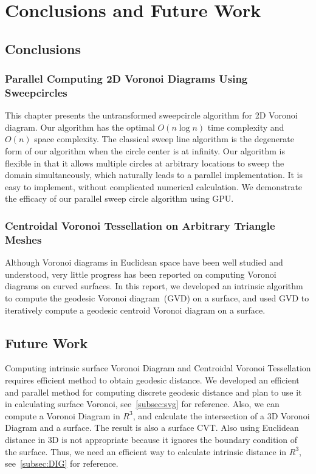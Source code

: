 \chapter{Conclusions and Future Work}
\label{conclusion}

\section{Conclusions}
\subsection{Parallel Computing 2D Voronoi Diagrams Using Sweepcircles}

This chapter presents the untransformed sweepcircle
algorithm for 2D Voronoi diagram. Our algorithm has the optimal
$O(n\log n)$ time complexity and $O(n)$ space complexity. The
classical sweep line algorithm is the degenerate form of our algorithm when the circle center is at infinity. Our
algorithm is flexible in that it allows multiple circles at
arbitrary locations to sweep the domain simultaneously, which
naturally leads to a parallel implementation. It is easy to
implement, without complicated numerical calculation. We demonstrate
the efficacy of our parallel sweep circle algorithm using GPU.

\subsection{Centroidal Voronoi Tessellation on Arbitrary Triangle Meshes}

Although Voronoi diagrams in Euclidean space have been well studied
 and understood, very little progress has been reported on computing
 Voronoi diagrams on curved surfaces. In this report, we developed
 an intrinsic algorithm to compute the geodesic Voronoi diagram~(GVD)
 on a surface, and used GVD  to iteratively
 compute a geodesic centroid Voronoi diagram on a surface.

\section{Future Work}

Computing intrinsic surface Voronoi Diagram
and Centroidal Voronoi Tessellation requires efficient
method to obtain geodesic distance. We developed an efficient
and parallel method for computing
discrete geodesic distance and plan to use it in calculating surface
Voronoi, see~\ref{subsec:svg} for reference.
Also, we can compute a Voronoi Diagram in $R^3$, and calculate
the intersection of a 3D Voronoi Diagram and a surface. The result
 is also a surface CVT. Also using
Euclidean distance in 3D is not appropriate because it ignores
the boundary condition of the surface.
Thus, we need an efficient way to calculate intrinsic distance
 in $R^3$, see~\ref{subsec:DIG} for reference.

